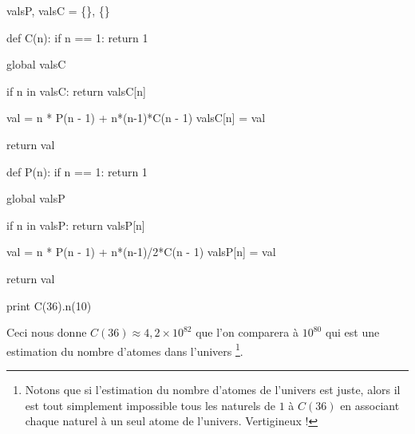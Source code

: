 \bigskip

\begin{myverb}
valsP, valsC = \{\}, \{\}

def C(n):
    if n == 1:
        return 1
        
    global valsC
    
    if n in valsC:
        return valsC[n]

    val      = n * P(n - 1) + n*(n-1)*C(n - 1)  
    valsC[n] = val
    
    return val

def P(n):
    if n == 1:
        return 1

    global valsP
    
    if n in valsP:
        return valsP[n]

    val      = n * P(n - 1) + n*(n-1)/2*C(n - 1)
    valsP[n] = val
    
    return val
    
print C(36).n(10)

\end{myverb}

\bigskip

Ceci nous donne $C(36) \approx 4,\!2 \times 10^{82}$ que l'on comparera à $10^{80}$ qui est une estimation du nombre d'atomes dans l'univers
\footnote{
    Notons que si l'estimation du nombre d'atomes de l'univers est juste, alors il est tout simplement impossible  tous les naturels de $1$ à $C(36)$ en associant chaque naturel à un seul atome de l'univers. Vertigineux !
}.
